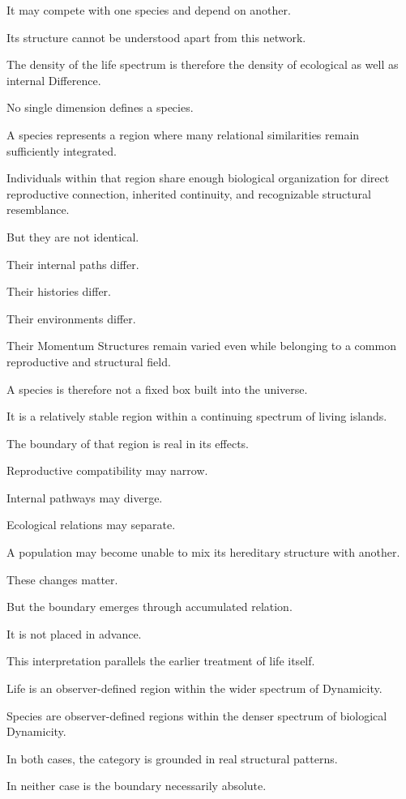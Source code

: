 It may compete with one species and depend on another.

Its structure cannot be understood apart from this network.

The density of the life spectrum is therefore the density of ecological as well as internal Difference.

No single dimension defines a species.

A species represents a region where many relational similarities remain sufficiently integrated.

Individuals within that region share enough biological organization for direct reproductive connection, inherited continuity, and recognizable structural resemblance.

But they are not identical.

Their internal paths differ.

Their histories differ.

Their environments differ.

Their Momentum Structures remain varied even while belonging to a common reproductive and structural field.

A species is therefore not a fixed box built into the universe.

It is a relatively stable region within a continuing spectrum of living islands.

The boundary of that region is real in its effects.

Reproductive compatibility may narrow.

Internal pathways may diverge.

Ecological relations may separate.

A population may become unable to mix its hereditary structure with another.

These changes matter.

But the boundary emerges through accumulated relation.

It is not placed in advance.

This interpretation parallels the earlier treatment of life itself.

Life is an observer-defined region within the wider spectrum of Dynamicity.

Species are observer-defined regions within the denser spectrum of biological Dynamicity.

In both cases, the category is grounded in real structural patterns.

In neither case is the boundary necessarily absolute.

